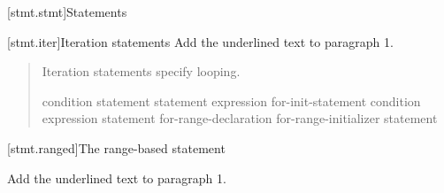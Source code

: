 
[stmt.stmt]{Statements}%

\setcounter{section}{4}
[stmt.iter]{Iteration statements}%
Add the underlined text to paragraph 1.

\begin{quote}
\pnum
Iteration statements specify looping.

%
%
%
%
\begin{bnf}
	\br
	 condition \terminal{)} statement\br
	 statement  expression \terminal{) ;}\br
	 for-init-statement condition\opt \terminal{;} expression\opt \terminal{)} statement\br
	  
    \terminal{(} for-range-declaration \terminal{:} for-range-initializer \terminal{)} statement\br
\end{bnf}
\end{quote}


\setcounter{subsection}{3}
[stmt.ranged]{The range-based  statement}%

Add the underlined text to paragraph 1.

